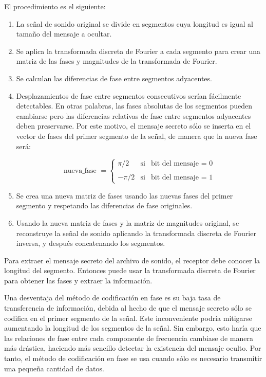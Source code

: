 \documentclass[12pt]{article}
\begin{document}
El procedimiento es el siguiente:

\begin{enumerate}

\item La señal de sonido original se divide en segmentos cuya longitud es igual al tamaño del mensaje a ocultar.

\item Se aplica la transformada discreta de Fourier a cada segmento para crear una matriz de las fases y magnitudes de la transformada de Fourier.

\item Se calculan las diferencias de fase entre segmentos adyacentes.

\item Desplazamientos de fase entre segmentos consecutivos serían fácilmente detectables. En otras palabras, las fases absolutas de los segmentos pueden cambiarse pero las diferencias relativas de fase entre segmentos adyacentes deben preservarse. Por este motivo, el mensaje secreto sólo se inserta en el vector de fases del primer segmento de la señal, de manera que la nueva fase será:

\[
\text{nueva\_fase }=\left\{
\begin{array}{ccc}
\pi /2 & \text{si} & \text{bit del mensaje = 0} \\
&  &  \\
-\pi /2 & \text{si} & \text{bit del mensaje = 1}
\end{array}
\right.
\]

\item Se crea una nueva matriz de fases usando las nuevas fases del primer segmento y respetando las diferencias de fase originales.

\item Usando la nueva matriz de fases y la matriz de magnitudes original, se reconstruye la señal de sonido aplicando la transformada discreta de Fourier inversa, y después concatenando los segmentos.

\end{enumerate}

Para extraer el mensaje secreto del archivo de sonido, el receptor debe conocer la longitud del segmento. Entonces puede usar la transformada discreta de Fourier para obtener las fases y extraer la información.

\medskip

Una desventaja del método de codificación en fase es su baja tasa de transferencia de información, debida al hecho de que el mensaje secreto sólo se codifica en el primer segmento de la señal. Este inconveniente podría mitigarse aumentando la longitud de los segmentos de la señal. Sin embargo, esto haría que las relaciones de fase entre cada componente de frecuencia cambiase de manera más drástica, haciendo más sencillo detectar la existencia del mensaje oculto. Por tanto, el método de codificación en fase se usa cuando sólo es necesario transmitir una pequeña cantidad de datos.
\end{document}
